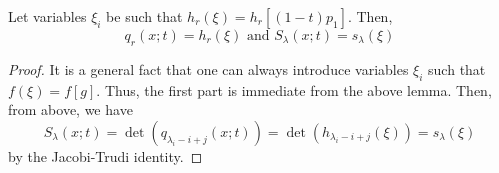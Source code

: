 \documentclass[11pt,leqno,oneside]{amsart}
\numberwithin{thm}{section}
\begin{document}
\begin{cor}
  Let variables \(\xi_i\) be such that \(h_r(\xi) =
  h_r[(1-t)p_1]\). Then, \[
    q_r(x;t) = h_r(\xi) \text{ and } S_\lambda(x;t) = s_\lambda(\xi)
  \]
\end{cor}
\begin{proof}
  It is a general fact that one can always introduce variables
  \(\xi_i\) such that \(f(\xi) = f[g]\). Thus, the first part is
  immediate from the above lemma. Then, from above, we have \[
    S_\lambda(x;t) = \det(q_{\lambda_i-i+j}(x;t)) =
    \det(h_{\lambda_i-i+j}(\xi)) = s_\lambda(\xi)
  \]
  by the Jacobi-Trudi identity.
\end{proof}
\begin{bibdiv}
  \begin{biblist}
  \end{biblist}
\end{bibdiv}
\end{document}
